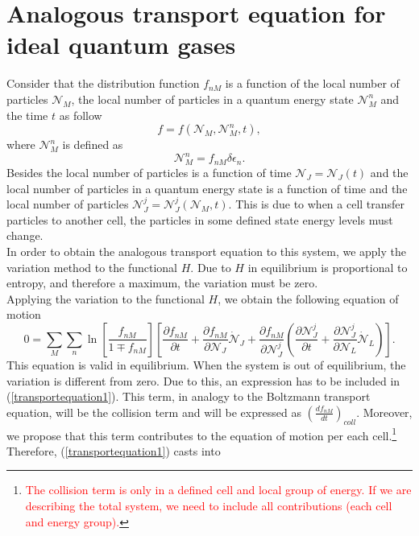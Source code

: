 \documentclass{article}
\begin{document}
\section{Analogous transport equation for ideal quantum gases}
Consider that the distribution function $f_{nM}$ is a function of the local number of particles $\mathcal{N}_M$, the local number of particles in a quantum energy state $\mathcal{N}_{M}^{n}$ and the time $t$ as follow
\begin{equation}
    f=f(\mathcal{N}_M,\mathcal{N}_M^{n},t),
\end{equation}
where $\mathcal{N}_{M}^{n}$ is defined as
\begin{equation}
    \mathcal{N}_{M}^{n}= f_{nM} \delta \epsilon_n.
\end{equation}
Besides the local number of particles is a function of time $\mathcal{N}_J=\mathcal{N}_J(t)$ and the local number of particles in a quantum energy state is a function of time and the local number of particles $\mathcal{N}_J^{j}=\mathcal{N}_J^{j}(\mathcal{N}_M,t)$. This is due to when a cell transfer particles to another cell, the particles in some defined state energy levels must change.\\
In order to obtain the analogous transport equation to this system, we apply the variation method to the functional $H$. Due to $H$ in equilibrium is proportional to entropy, and therefore a maximum, the variation must be zero.\\
Applying the variation to the functional $H$, we obtain the following equation of motion
\begin{equation}
    0=\sum_M \sum_n \ln \left[ \frac{f_{nM}}{1\mp f_{nM}} \right] \left[ \frac{\partial f_{nM}}{\partial t}+\frac{\partial f_{nM}}{\partial \mathcal{N}_J}\dot{\mathcal{N}}_J+\frac{\partial f_{nM}}{\partial \mathcal{N}_J^{j}}\left( \frac{\partial \mathcal{N}_J^{j}}{\partial t}+\frac{\partial \mathcal{N}_J^{j}}{\partial \mathcal{N}_L}\dot{\mathcal{N}}_L \right) \right]. \label{transportequation1}
\end{equation}
This equation is valid in equilibrium. When the system is out of equilibrium, the variation is different from zero. Due to this, an expression has to be included in (\ref{transportequation1}). This term, in analogy to the Boltzmann transport equation, will be the collision term and will be expressed as $\left( \frac{df_{nM}}{dt} \right)_{coll}$. Moreover, we propose that this term contributes to the equation of motion per each cell.\footnote{\textcolor{red}{The collision term is only in a defined cell and local group of energy. If we are describing the total system, we need to include all contributions (each cell and energy group).}} Therefore, (\ref{transportequation1}) casts into
\end{document}
